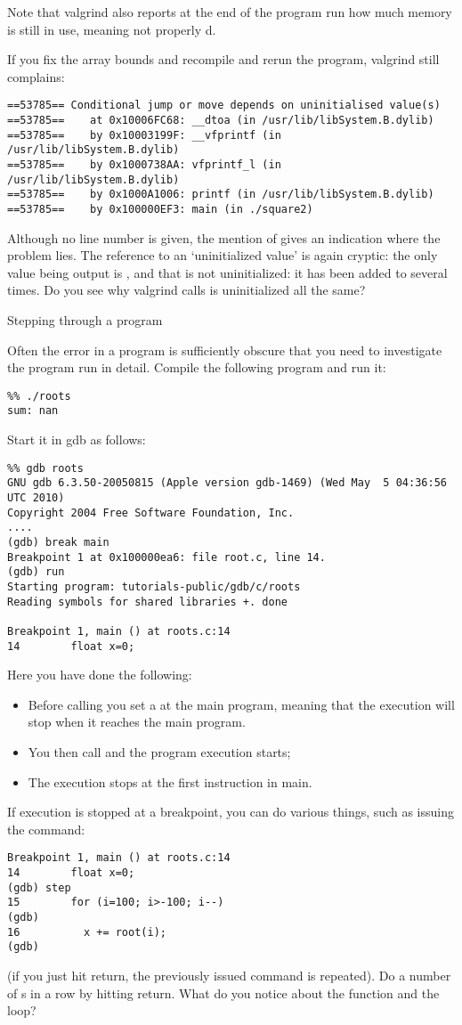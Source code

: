 Note that valgrind also reports at the end of the program run how much
memory is still in use, meaning not properly d.

If you fix the array bounds and recompile and rerun the program,
valgrind still complains:
{\small
\begin{verbatim}
==53785== Conditional jump or move depends on uninitialised value(s)
==53785==    at 0x10006FC68: __dtoa (in /usr/lib/libSystem.B.dylib)
==53785==    by 0x10003199F: __vfprintf (in /usr/lib/libSystem.B.dylib)
==53785==    by 0x1000738AA: vfprintf_l (in /usr/lib/libSystem.B.dylib)
==53785==    by 0x1000A1006: printf (in /usr/lib/libSystem.B.dylib)
==53785==    by 0x100000EF3: main (in ./square2)
\end{verbatim}
}
Although no line number is given, the mention of  gives an
indication where the problem lies.
The reference to an `uninitialized value' is again cryptic: the only
value being output is , and that is not uninitialized: it has
been added to several times. Do you see why valgrind calls is
uninitialized all the same?


 {Stepping through a program}

Often the error in a program is sufficiently obscure that you need to
investigate the program run in detail. Compile the following program
%
%
and run it:
\begin{verbatim}
%% ./roots
sum: nan
\end{verbatim}
Start it in gdb as follows:
\begin{verbatim}
%% gdb roots
GNU gdb 6.3.50-20050815 (Apple version gdb-1469) (Wed May  5 04:36:56 UTC 2010)
Copyright 2004 Free Software Foundation, Inc.
....
(gdb) break main
Breakpoint 1 at 0x100000ea6: file root.c, line 14.
(gdb) run
Starting program: tutorials-public/gdb/c/roots
Reading symbols for shared libraries +. done

Breakpoint 1, main () at roots.c:14
14        float x=0;
\end{verbatim}
Here you have done the following:
\begin{itemize}
\item Before calling  you set a  at the
  main program, meaning that the execution will stop when it reaches
  the main program.
\item You then call  and the program execution starts;
\item The execution stops at the first instruction in main.
\end{itemize}
If execution is stopped at a breakpoint, you can do various things,
such as issuing the  command:
\begin{verbatim}
Breakpoint 1, main () at roots.c:14
14        float x=0;
(gdb) step
15        for (i=100; i>-100; i--)
(gdb) 
16          x += root(i);
(gdb) 
\end{verbatim}
(if you just hit return, the previously issued command is
repeated). Do a number of s in a row by hitting return. What
do you notice about the function and the loop?

